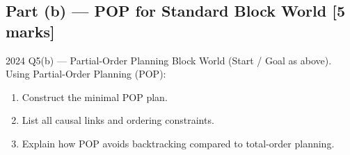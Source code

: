 \documentclass[12pt,a4paper]{article}
\begin{document}
\subsection{Part (b) --- POP for Standard Block World [5 marks]}

\begin{qbox}{2024 Q5(b) --- Partial-Order Planning}
Block World (Start / Goal as above).
Using Partial-Order Planning (POP):
\begin{enumerate}[noitemsep]
  \item Construct the minimal POP plan.
  \item List all causal links and ordering constraints.
  \item Explain how POP avoids backtracking compared to total-order planning.
\end{enumerate}
\end{qbox}
\end{document}
